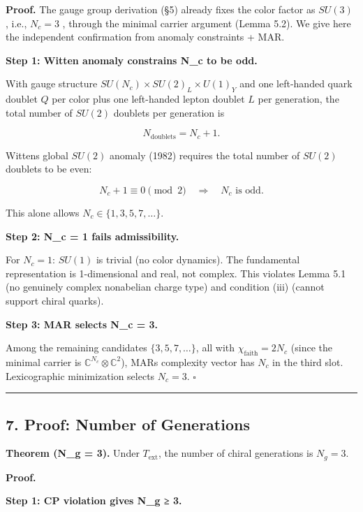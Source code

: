 \textbf{Proof.} The gauge group derivation (§5) already fixes the color factor as \(SU(3)\) , i.e., \(N_c = 3\) , through the minimal carrier argument (Lemma 5.2). We give here the independent confirmation from anomaly constraints + MAR.

\textbf{Step 1: Witten anomaly constrains N\_c to be odd.}

With gauge structure \(SU(N_c) \times SU(2)_L \times U(1)_Y\) and one left-handed quark doublet \(Q\) per color plus one left-handed lepton doublet \(L\) per generation, the total number of \(SU(2)\) doublets per generation is

\[N_{\mathrm{doublets}} = N_c + 1.\]

Witten\textquotesingle s global \(SU(2)\) anomaly (1982) requires the total number of \(SU(2)\) doublets to be even:

\[N_c + 1 \equiv 0 \pmod{2} \quad \Longrightarrow \quad N_c \text{ is odd}.\]

This alone allows \(N_c \in \{1, 3, 5, 7, \ldots\}\).

\textbf{Step 2: N\_c = 1 fails admissibility.}

For \(N_c = 1\): \(SU(1)\) is trivial (no color dynamics). The fundamental representation is 1-dimensional and real, not complex. This violates Lemma 5.1 (no genuinely complex nonabelian charge type) and condition (iii) (cannot support chiral quarks).

\textbf{Step 3: MAR selects N\_c = 3.}

Among the remaining candidates \(\{3, 5, 7, \ldots\}\), all with \(\chi_{\mathrm{faith}} = 2N_c\) (since the minimal carrier is \(\mathbb{C}^{N_c} \otimes \mathbb{C}^2\)), MAR\textquotesingle s complexity vector has \(N_c\) in the third slot. Lexicographic minimization selects \(N_c = 3\). \(\square\)

\begin{center}\rule{0.5\linewidth}{0.5pt}\end{center}

\subsection{7. Proof: Number of Generations}\label{7-proof-number-of-generations}

\textbf{Theorem (N\_g = 3).} Under \(T_{\mathrm{ext}}\), the number of chiral generations is \(N_g = 3\).

\textbf{Proof.}

\textbf{Step 1: CP violation gives N\_g ≥ 3.}


